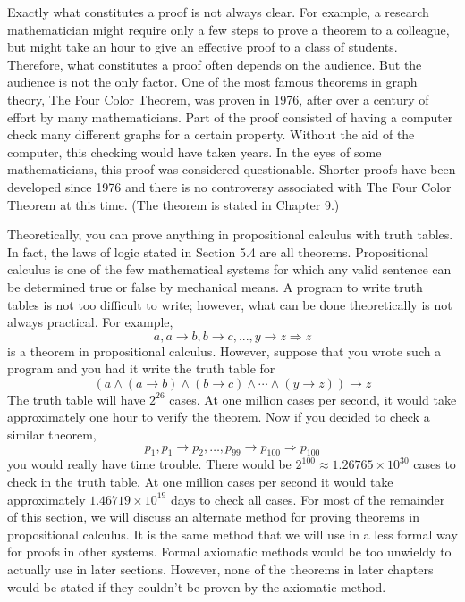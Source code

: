 \documentclass[10pt,]{book}
\theoremstyle{plain}
\theoremstyle{definition}
\theoremstyle{definition}
\theoremstyle{definition}
\theoremstyle{definition}
\begin{document}
Exactly what constitutes a proof is not always clear. For example, a research mathematician might require only a few steps to prove a theorem to a colleague, but might take an hour to give an effective proof to a class of students. Therefore, what constitutes a proof often depends on the audience. But the audience is not the only factor. One of the most famous theorems in graph theory, The Four Color Theorem, was proven in 1976, after over a century of effort by many mathematicians.  Part of the proof consisted of having a computer check many different graphs for a certain property. Without the aid of the computer, this checking would have taken years. In the eyes of some mathematicians, this proof was considered questionable. Shorter proofs have been developed since 1976 and there is no controversy associated with The Four Color Theorem at this time. (The
theorem is stated in Chapter 9.)%
\par
Theoretically, you can prove anything in propositional calculus with truth tables. In fact, the laws of logic stated in Section 5.4 are all theorems.  Propositional calculus is one of the few mathematical systems for which any valid sentence can be determined true or false by mechanical means. A program to write truth tables is not too difficult to write; however, what can be done theoretically is not always practical. For example,
\begin{equation*}a, a\to  b, b\to  c, . . . ,y\to z\Rightarrow z\end{equation*}
is a theorem in propositional calculus. However, suppose that you wrote such a program and you had it write the truth table for
\begin{equation*}(a\land  (a\to  b)\land ( b\to  c)\land \cdots \land (y\to z))\to z\end{equation*}
The truth table will have \(2^{26}\) cases. At one million cases per second, it would take approximately one hour to verify the theorem.  Now if you decided to check a similar theorem,
\begin{equation*}p_1,p_1\to p_2,\ldots  ,p_{99}\to p_{100}\Rightarrow p_{100}\end{equation*}
you would really have time trouble. There would be \(2^{100} \approx 1.26765\times 10^{30}\) cases to check in the truth table.  At one million cases per second it would take approximately \(1.46719\times 10^{19}\) days to check all cases.  For most of the remainder of this section, we will discuss an alternate method for proving theorems in propositional calculus. It is the same method that we will use in a less formal way for proofs in other systems. Formal axiomatic methods would be too unwieldy to actually use in later sections. However, none of the theorems in later chapters would be stated if they couldn't be proven by the axiomatic method.%
\end{document}
